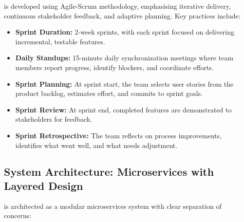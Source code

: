 \projectname{} is developed using Agile-Scrum methodology, emphasising iterative delivery, continuous stakeholder feedback, and adaptive planning. Key practices include:
\begin{itemize}
    \item \textbf{Sprint Duration:} 2-week sprints, with each sprint focused on delivering incremental, testable features.
    \item \textbf{Daily Standups:} 15-minute daily synchronization meetings where team members report progress, identify blockers, and coordinate efforts.
    \item \textbf{Sprint Planning:} At sprint start, the team selects user stories from the product backlog, estimates effort, and commits to sprint goals.
    \item \textbf{Sprint Review:} At sprint end, completed features are demonstrated to stakeholders for feedback.
    \item \textbf{Sprint Retrospective:} The team reflects on process improvements, identifies what went well, and what needs adjustment.
\end{itemize}

\subsection{System Architecture: Microservices with Layered Design}

\projectname{} is architected as a modular microservices system with clear separation of concerns:

